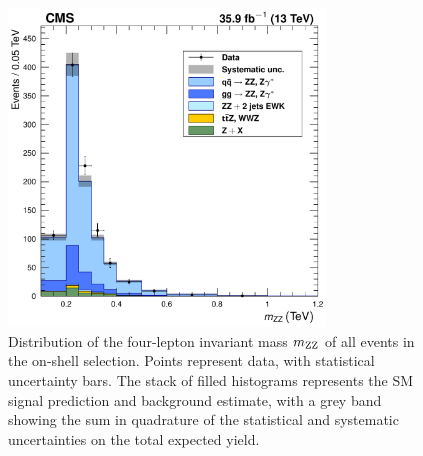 \begin{figure}[htbp]
  \begin{center}
    \includegraphics[width=0.75\textwidth]{results/smpzzMass.pdf}
    \caption[Four-lepton mass spectrum for events with both {\PZ} candidates on-shell]{
        Distribution of the four-lepton invariant mass $m_{\mathrm{Z}\mathrm{Z}}$ of all events in the on-shell selection.
        Points represent data, with statistical uncertainty bars.
        The stack of filled histograms represents the SM signal prediction and background estimate, with a grey band showing the sum in quadrature of the statistical and systematic uncertainties on the total expected yield.
      }\label{fig:mass_smp}
  \end{center}
\end{figure}

